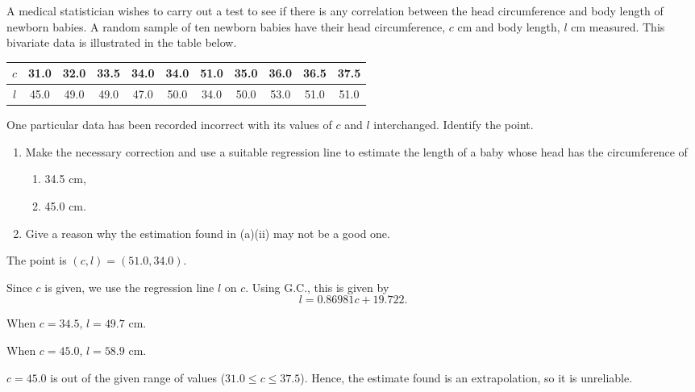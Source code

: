 \begin{problem}
    A medical statistician wishes to carry out a test to see if there is any correlation between the head circumference and body length of newborn babies. A random sample of ten newborn babies have their head circumference, $c$ cm and body length, $l$ cm measured. This bivariate data is illustrated in the table below.

    \begin{table}[H]
        \centering
        \begin{tabular}{|c|c|c|c|c|c|c|c|c|c|c|}
        \hline
        $c$ & 31.0 & 32.0 & 33.5 & 34.0 & 34.0 & 51.0 & 35.0 & 36.0 & 36.5 & 37.5 \\ \hline
        $l$ & 45.0 & 49.0 & 49.0 & 47.0 & 50.0 & 34.0 & 50.0 & 53.0 & 51.0 & 51.0 \\ \hline
        \end{tabular}
    \end{table}

    One particular data has been recorded incorrect with its values of $c$ and $l$ interchanged. Identify the point.

    \begin{enumerate}
        \item Make the necessary correction and use a suitable regression line to estimate the length of a baby whose head has the circumference of
        \begin{enumerate}
            \item 34.5 cm,
            \item 45.0 cm.
        \end{enumerate}
        \item Give a reason why the estimation found in (a)(ii) may not be a good one.
    \end{enumerate}
\end{problem}
\begin{solution}
    The point is $(c, l) = (51.0, 34.0)$.

    \begin{ppart}
        Since $c$ is given, we use the regression line $l$ on $c$. Using G.C., this is given by \[l = 0.86981 c + 19.722.\]
        \begin{psubpart}
            When $c = 34.5$, $l = 49.7$ cm.
        \end{psubpart}
        \begin{psubpart}
            When $c = 45.0$, $l = 58.9$ cm.
        \end{psubpart}
    \end{ppart}
    \begin{ppart}
        $c = 45.0$ is out of the given range of values ($31.0 \leq c \leq 37.5$). Hence, the estimate found is an extrapolation, so it is unreliable.
    \end{ppart}
\end{solution}

